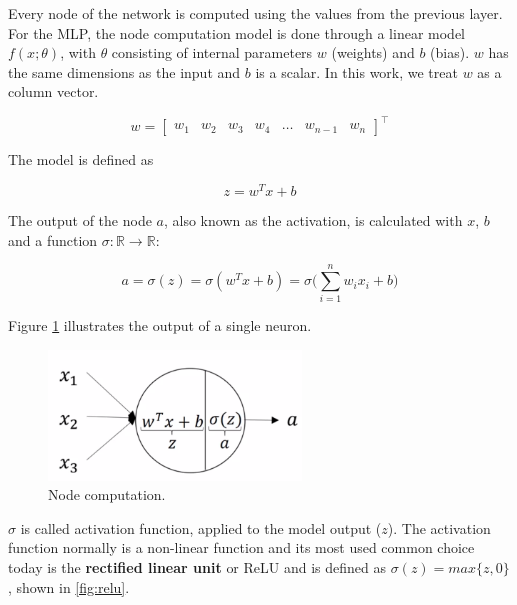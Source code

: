 Every node of the network is computed using the values from the previous layer. 
For the MLP, the node computation model is done through
a linear model $f(x; \theta)$, with $\theta$ consisting of internal parameters $w$ (weights) and $b$ (bias).
$w$ has the same dimensions as the input and $b$ is a scalar.
In this work, we treat $w$ as a column vector.

\begin{equation}
    w = \begin{bmatrix}
            w_1 & w_2 & w_3 & w_4 & \dots & w_{n-1} & w_{n}
        \end{bmatrix}^\intercal
\end{equation}

The model is defined as

\begin{equation}
    z = w^Tx + b
\end{equation}

The output of the node $a$, also known as the activation, is calculated with $x$, $b$ and 
a function $\sigma : \mathbb{R} \rightarrow \mathbb{R}$:

\begin{equation}
    a = \sigma(z) = \sigma(w^T x + b) = \sigma \bigg(\sum_{i=1}^n w_i x_i + b \bigg)
\end{equation}

Figure \ref{fig:neuralnet_out} illustrates the output of a single neuron.

\begin{figure}[ht]
    \centering
    \includegraphics[width=0.6\textwidth]{Chapter3/neuralnet_output.png}
    \caption{Node computation.}
    \label{fig:neuralnet_out}
\end{figure}

$\sigma$ is called activation function, applied to the model output ($z$).
The activation function normally is a non-linear function and its most used common choice
today is the \textbf{rectified linear unit} \cite{ReLU} or ReLU
and is defined as $\sigma(z) = max\{z, 0\}$, shown in \ref{fig:relu}. 

